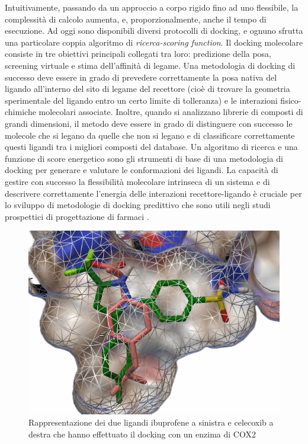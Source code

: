 Intuitivamente, passando da un approccio a corpo rigido fino ad uno flessibile, la complessità di calcolo aumenta, e, proporzionalmente, anche il tempo di esecuzione.\newline
Ad oggi sono disponibili diversi protocolli di docking, e ognuno sfrutta una particolare coppia algoritmo di \textit{ricerca-scoring function}.\newline
Il docking molecolare consiste in tre obiettivi principali collegati tra loro: predizione della posa, screening virtuale e stima dell'affinità di legame. Una metodologia di docking di successo deve essere in grado di prevedere correttamente la posa nativa del ligando all'interno del sito di legame del recettore (cioè di trovare la geometria sperimentale del ligando entro un certo limite di tolleranza) e le interazioni fisico-chimiche molecolari associate. Inoltre, quando si analizzano librerie di composti di grandi dimensioni, il metodo deve essere in grado di distinguere con successo le molecole che si legano da quelle che non si legano e di classificare correttamente questi ligandi tra i migliori composti del database. Un algoritmo di ricerca e una funzione di score energetico sono gli strumenti di base di una metodologia di docking per generare e valutare le conformazioni dei ligandi. La capacità di gestire con successo la flessibilità molecolare intrinseca di un sistema e di descrivere correttamente l'energia delle interazioni recettore-ligando è cruciale per lo sviluppo di metodologie di docking predittivo che sono utili negli studi prospettici di progettazione di farmaci \cite{guedes2014receptor}.

\begin{figure}[H]
    \centering
    \includegraphics[scale=0.5]{immagini/dockingMolecolare.png}
    \caption{Rappresentazione dei due ligandi ibuprofene a sinistra e celecoxib a destra che hanno effettuato il docking con un enzima di COX2}
    \label{fig:Docking Molecolare}
\end{figure}

